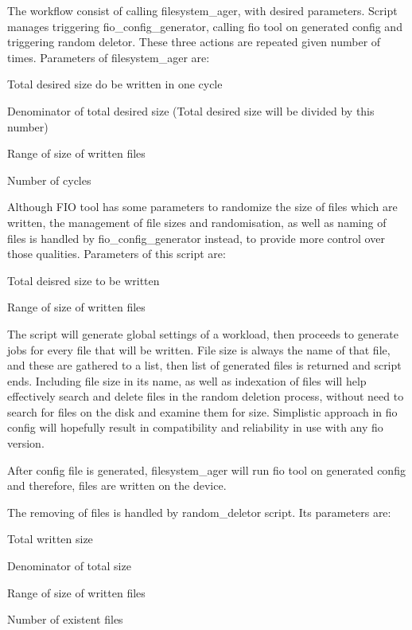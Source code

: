 \documentclass[
  color, %
  table, %
  lof,   %
  lot,   %
]{fithesis3}
\begin{document}
The workflow consist of calling filesystem\_ager, with desired parameters. Script manages triggering fio\_config\_generator, calling fio tool on generated config and triggering random deletor. These three actions are repeated given number of times.
Parameters of filesystem\_ager are: 
\begin{compactenum}
  \item Total desired size do be written in one cycle
  \item Denominator of total desired size (Total desired size will be divided by this number)
  \item Range of size of written files
  \item Number of cycles
\end{compactenum}

Although FIO tool has some parameters to randomize the size of files which are written, the management of file sizes and randomisation, as well as naming of files is handled by fio\_config\_generator instead, to provide more control over those qualities.
Parameters of this script are:
\begin{compactenum}
  \item Total deisred size to be written
  \item Range of size of written files
\end{compactenum}

The script will generate global settings of a workload, then proceeds to generate jobs for every file that will be written. File size is always the name of that file, and these are gathered to a list, then list of generated files is returned and script ends. Including file size in its name, as well as indexation of files will help effectively search and delete files in the random deletion process, without need to search for files on the disk and examine them for size. Simplistic approach in fio config will hopefully result in compatibility and reliability in use with any fio version.

After config file is generated, filesystem\_ager will run fio tool on generated config and therefore, files are written on the device.

The removing of files is handled by random\_deletor script. Its parameters are:
\begin{compactenum}
  \item Total written size
  \item Denominator of total size
  \item Range of size of written files
  \item Number of existent files
\end{compactenum}
\end{document}
